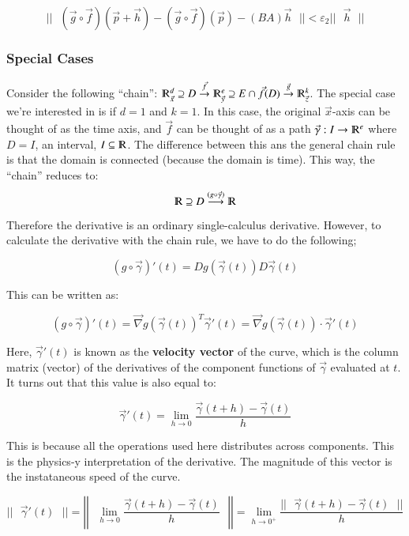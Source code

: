 \documentclass [12 pt, twoside] {book}
\newcommand\+{\text{ }}
\newcommand{\gradient}{\vec{\nabla}}
\begin{document}
\[
    ||\+(\vec{g} \circ \vec{f})(\vec{p} + \vec{h}) - (\vec{g} \circ
    \vec{f})(\vec{p}) - (BA) \vec{h}\+||
    < \varepsilon_2 ||\+\vec{h}\+||
\]

\subsubsection{Special Cases}

Consider the following ``chain'': $\varmathbb{R}^d_{\vec{x}} \supseteq D
\overset{\vec{f}}{\to} \varmathbb{R}^e_{\vec{y}} \supseteq E \cap \vec{f}(D)
\overset{\vec{g}}{\to} \varmathbb{R}^k_{\vec{z}}$. The special case we're
interested in is if $d = 1$ and $k = 1$. In this case, the original $\vec{x}$-axis can be
thought of as the time axis, and $\vec{f}$ can be thought of as a path
$\vec{\gamma}: I \to \varmathbb{R}^e$ where $D = I$, an interval, $I \subseteq
\varmathbb{R}$. The difference between this ans the general chain rule is that
the domain is connected (because the domain is time). This way, the ``chain''
reduces to: 
$$\varmathbb{R} \supseteq D \overset{(g \circ
\vec{\gamma})}{\longrightarrow} \varmathbb{R}$$

Therefore the derivative is an ordinary single-calculus derivative. However, to
calculate the derivative with the chain rule, we have to do the following;

$$(g \circ \vec{\gamma})'(t) = Dg(\vec{\gamma}(t))D\vec{\gamma}(t)$$

This can be written as:

$$(g \circ \vec{\gamma})'(t) = \gradient g(\vec{\gamma}(t))^T \vec{\gamma}'(t) =
\boxed{\gradient g(\vec{\gamma}(t))\cdot\vec{\gamma}'(t)}$$

Here, $\vec{\gamma}'(t)$ is known as the \textbf{velocity vector} of the curve,
which is the column matrix (vector) of the derivatives of the component
functions of $\vec{\gamma}$ evaluated at $t$. It turns out that this value is
also equal to:

$$\vec{\gamma}'(t) = \lim_{h \to 0} \frac{\vec{\gamma}(t + h) -
\vec{\gamma}(t)}{h}$$

This is because all the operations used here distributes across components. This
is the physics-y interpretation of the derivative. The magnitude of this vector
is the instataneous speed of the curve.

$$ ||\+\vec{\gamma}'(t)\+|| = \left|\left|\+\lim_{h \to 0} \frac{\vec{\gamma}(t + h) -
\vec{\gamma}(t)}{h}\+\right|\right| = \lim_{h \to 0^+} \frac{||\+\vec{\gamma}(t + h) -
\vec{\gamma}(t)\+||}{h}$$
\end{document}

